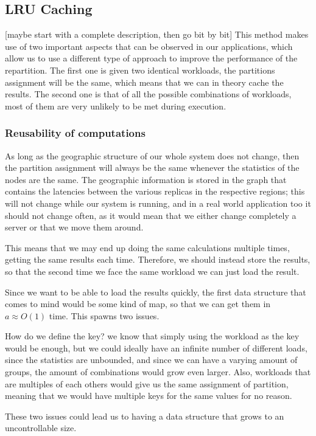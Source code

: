 \subsection{LRU Caching}\label{sec:lru-caching}
[maybe start with a complete description, then go bit by bit]
This method makes use of two important aspects that can be observed in our applications, which allow us to use a different type of approach to improve the performance of the repartition. The first one is given two identical workloads, the partitions assignment will be the same, which means that we can in theory cache the results. The second one is that of all the possible combinations of workloads, most of them are very unlikely to be met during execution.

\subsubsection{Reusability of computations}\label{sec:Reusability-of-computations}
As long as the geographic structure of our whole system does not change, then the partition assignment will always be the same whenever the statistics of the nodes are the same. The geographic information is stored in the graph that contains the latencies between the various replicas in the respective regions; this will not change while our system is running, and in a real world application too it should not change often, as it would mean that we either change completely a server or that we move them around. 

This means that we may end up doing the same calculations multiple times, getting the same results each time. Therefore, we should instead store the results, so that the second time we face the same workload we can just load the result. 

Since we want to be able to load the results quickly, the first data structure that comes to mind would be some kind of map, so that we can get them in $a\approx O(1)$ time. This spawns two issues.

How do we define the key? we know that simply using the workload as the key would be enough, but we could ideally have an infinite number of different loads, since the statistics are unbounded, and since we can have a varying amount of groups, the amount of combinations would grow even larger. Also, workloads that are multiples of each others would give us the same assignment of partition, meaning that we would have multiple keys for the same values for no reason.

These two issues could lead us to having a data structure that grows to an uncontrollable size.

